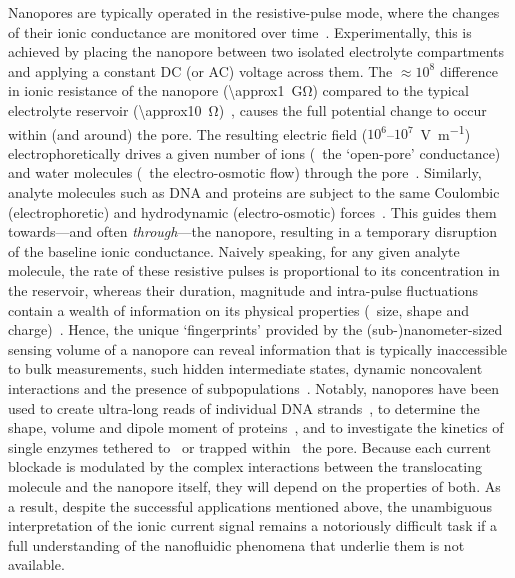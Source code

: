 Nanopores are typically operated in the resistive-pulse mode, where the changes of their ionic conductance are
monitored over time~\cite{Bayley-2001,Dekker-2007,Maglia-2010,Venkatesan-2011}. Experimentally, this is
achieved by placing the nanopore between two isolated electrolyte compartments and applying a constant DC (or
AC) voltage across them. The $\approx10^8$ difference in ionic resistance of the nanopore
(\SI{\approx1}{\giga\ohm}) compared to the typical electrolyte reservoir
(\SI{\approx10}{\ohm})~\cite{Maglia-2010}, causes the full potential change to occur within (and around) the
pore. The resulting electric field ($10^6$--$10^7$~\si{\V\per\m}) electrophoretically drives a given number of
ions (\ie~the `open-pore' conductance) and water molecules (\ie~the electro-osmotic flow) through the
pore~\cite{Wong-2007,Mao-2014,Haywood-2014,Laohakunakorn-2015}. Similarly, analyte molecules such as DNA and
proteins are subject to the same Coulombic (electrophoretic) and hydrodynamic (electro-osmotic)
forces~\cite{Wong-2007,Grosberg-2010,Muthukumar-2010,Muthukumar-2014}. This guides them towards---and often
\emph{through}---the nanopore, resulting in a temporary disruption of the baseline ionic conductance. Naively
speaking, for any given analyte molecule, the rate of these resistive pulses is proportional to its
concentration in the reservoir, whereas their duration, magnitude and intra-pulse fluctuations contain a
wealth of information on its physical properties (\eg~size, shape and
charge)~\cite{Howorka-2009,Ying-2019,Lu-2020}. Hence, the unique `fingerprints' provided by the
(sub-)nanometer-sized sensing volume of a nanopore can reveal information that is typically inaccessible to
bulk measurements, such hidden intermediate states, dynamic noncovalent interactions and the presence of
subpopulations~\cite{Ying-2019,Lu-2020}. Notably, nanopores have been used to create ultra-long reads of
individual DNA strands~\cite{Jain-2018}, to determine the shape, volume and dipole moment of
proteins~\cite{Yusko-2017,Houghtaling-2019}, and to investigate the kinetics of single enzymes tethered
to~\cite{Derrington-2015,Harrington-2019} or trapped within~\cite{Li-2020,Galenkamp-2020} the pore. Because
each current blockade is modulated by the complex interactions between the translocating molecule and the
nanopore itself, they will depend on the properties of both. As a result, despite the successful applications
mentioned above, the unambiguous interpretation of the ionic current signal remains a notoriously difficult
task if a full understanding of the nanofluidic phenomena that underlie them is not available.

